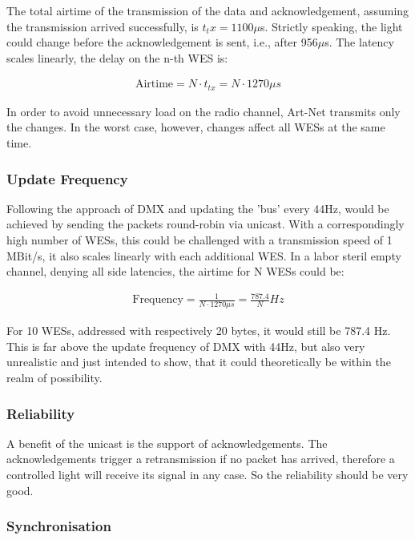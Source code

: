 The total airtime of the transmission of the data and acknowledgement, 
assuming the transmission arrived successfully, is $t_tx=1100\mu$s.
Strictly speaking, the light could change before the acknowledgement is sent, 
i.e., after 956$\mu$s.
The latency scales linearly, the delay on the n-th WES is:

\begin{align}
	\text{Airtime} = N \cdot t_{tx} = N \cdot 1270\mu s
\end{align}

In order to avoid unnecessary load on the radio channel, Art-Net transmits only the changes.
In the worst case, however, changes affect all WESs at the same time.

\subsubsection*{Update Frequency}
Following the approach of DMX and updating the 'bus' every 44Hz,
would be achieved by sending the packets round-robin via unicast. 
With a correspondingly high number of WESs, this could be challenged with a transmission speed of 1 MBit/s, 
it also scales linearly with each additional WES. 
In a labor steril empty channel, denying all side latencies, the airtime for N WESs could be:

\begin{align}
	\text{Frequency} = \frac{1}{N \cdot 1270\mu s} = \frac{787.4}{N} Hz
\end{align}

For 10 WESs, addressed with respectively 20 bytes, it would still be 787.4 Hz.
This is far above the update frequency of DMX with 44Hz, but also very unrealistic and just intended to show,
that it could theoretically be within the realm of possibility.

\subsubsection*{Reliability}

A benefit of the unicast is the support of acknowledgements. 
The acknowledgements trigger a retransmission if no packet has arrived, therefore a controlled light will receive its signal in any case.
So the reliability should be very good.

\subsubsection*{Synchronisation}

